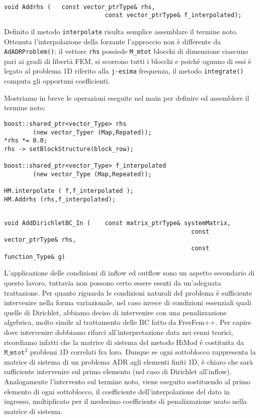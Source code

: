\begin{lstlisting}[style=general, frame = top]

void Addrhs	(	const vector_ptrType& rhs,
							const vector_ptrType& f_interpolated);
\end{lstlisting}
Definito il metodo \texttt{interpolate} risulta semplice assemblare il termine noto. Ottenuta l'interpolazione della forzante l'approccio non 
\`e differente da \texttt{AdADRProblem()}: il vettore \texttt{rhs} possiede \texttt{M\_mtot} blocchi di dimensione ciascuno pari ai gradi di 
libert\`a FEM, si scorrono tutti i blocchi e poich\`e ognuno di essi \`e legato al problema 1D riferito alla \texttt{j-esima} frequenza, il 
metodo \texttt{integrate()} computa gli opportuni coefficienti.

Mostriamo in breve le operazioni eseguite nel main per definire ed assemblere il termine noto:
\begin{lstlisting}[style = general]
boost::shared_ptr<vector_Type> rhs 
		(new vector_Typer (Map,Repated));
*rhs *= 0.0;
rhs -> setBlockStructure(block_row);

boost::shared_ptr<vector_Type> f_interpolated 
		(new vector_Type (Map,Repeated));

HM.interpolate ( f,f_interpolated );
HM.Addrhs (rhs,f_interpolated);
\end{lstlisting}

\begin{lstlisting}[style = general,frame = top]

void AddDirichletBC_In (	const matrix_ptrType& systemMatrix,
													const vector_ptrType& rhs,
													const function_Type& g)
\end{lstlisting}

L'applicazione delle condizioni di inflow ed outflow sono un aspetto secondario di questo lavoro, tuttavia non possono certo essere esenti da 
un'adeguata trattazione. Per quanto riguarda le condizioni naturali del problema \`e sufficiente intervenire nella forma variazionale, nel caso 
invece di condizioni essenziali quali quelle di Dirichlet, abbiamo deciso di intervenire con una penalizzazione algebrica, molto simile al 
trattamento delle BC fatto da FreeFem++. Per capire dove intervenire dobbiamo rifarci all'interpretazione data nei cenni teorici, ricordiamo 
infatti che la matrice di sistema del metodo HiMod \`e costituita da $\texttt{M\_mtot}^2$ problemi 1D correlati fra loro. Dunque se ogni 
sottoblocco rappresenta la matrice di sistema di un problema ADR agli elementi finiti 1D, \`e chiaro che sar\`a sufficiente intervenire sul 
primo elemento (nel caso di Dirichlet all'inflow). Analogamente l'intervento sul termine noto, viene eseguito sostituendo al primo elemento di 
ogni sottoblocco, il coefficiente 
dell'interpolazione del dato in ingresso, moltiplicato per il medesimo coefficiente di penalizzazione usato nella matrice di sistema.

